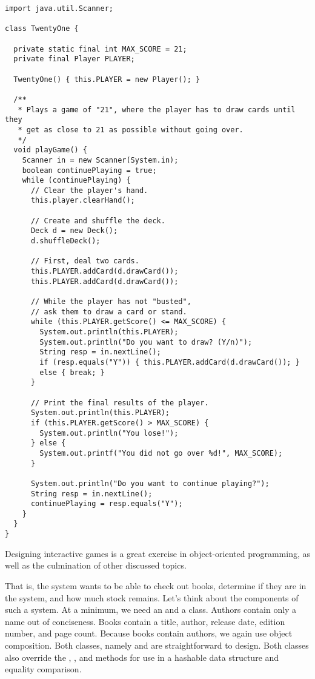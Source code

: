 \enlargethispage{1\baselineskip}
\begin{lstlisting}[language=MyJava]
import java.util.Scanner;

class TwentyOne {

  private static final int MAX_SCORE = 21;
  private final Player PLAYER;

  TwentyOne() { this.PLAYER = new Player(); }

  /**
   * Plays a game of "21", where the player has to draw cards until they
   * get as close to 21 as possible without going over.
   */
  void playGame() {
    Scanner in = new Scanner(System.in);
    boolean continuePlaying = true;
    while (continuePlaying) {
      // Clear the player's hand.
      this.player.clearHand();

      // Create and shuffle the deck.
      Deck d = new Deck();
      d.shuffleDeck();

      // First, deal two cards.
      this.PLAYER.addCard(d.drawCard());
      this.PLAYER.addCard(d.drawCard());

      // While the player has not "busted", 
      // ask them to draw a card or stand.
      while (this.PLAYER.getScore() <= MAX_SCORE) {
        System.out.println(this.PLAYER);
        System.out.println("Do you want to draw? (Y/n)");
        String resp = in.nextLine();
        if (resp.equals("Y")) { this.PLAYER.addCard(d.drawCard()); }
        else { break; }
      }

      // Print the final results of the player.
      System.out.println(this.PLAYER);
      if (this.PLAYER.getScore() > MAX_SCORE) {
        System.out.println("You lose!");
      } else {
        System.out.printf("You did not go over %d!", MAX_SCORE);
      }

      System.out.println("Do you want to continue playing?");
      String resp = in.nextLine();
      continuePlaying = resp.equals("Y");
    }
  }
}
\end{lstlisting}

Designing interactive games is a great exercise in object-oriented programming, as well as the culmination of other discussed topics.

That is, the system wants to be able to check out books, determine if they are in the system, and how much stock remains.
Let's think about the components of such a system.
At a minimum, we need an  and a  class.
Authors contain only a name out of conciseness.
Books contain a title, author, release date, edition number, and page count.
Because books contain authors, we again use object composition. 
Both classes, namely  and  are straightforward to design. Both classes also override the , , and  methods for use in a hashable data structure and equality comparison.

